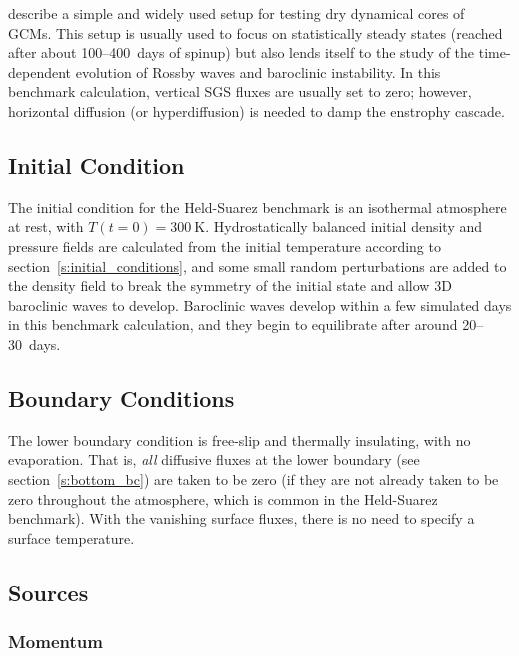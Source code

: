\documentclass{report}
\begin{document}
{\citet{Held94} describe a simple and widely used setup for testing dry dynamical cores of GCMs. This setup is usually used to focus on statistically steady states (reached after about 100--400~days of spinup) but also lends itself to the study of the time-dependent evolution of Rossby waves and baroclinic instability. In this benchmark calculation, vertical SGS fluxes are usually set to zero; however, horizontal diffusion (or hyperdiffusion) is needed to damp the enstrophy cascade. 

\subsection{Initial Condition}

The initial condition for the Held-Suarez benchmark is an isothermal atmosphere at rest, with $T(t=0) = 300~\mathrm{K}$. Hydrostatically balanced initial density and pressure fields are calculated from the initial temperature according to section~\ref{s:initial_conditions}, and some small random perturbations are added to the density field to break the symmetry of the initial state and allow 3D baroclinic waves to develop. Baroclinic waves develop within a few simulated days in this benchmark calculation, and they begin to equilibrate after around 20--30~days. 

\subsection{Boundary Conditions}

The lower boundary condition is free-slip and thermally insulating, with no evaporation. That is, \emph{all} diffusive fluxes at the lower boundary (see section~\ref{s:bottom_bc}) are taken to be zero (if they are not already taken to be zero throughout the atmosphere, which is common in the Held-Suarez benchmark). With the vanishing surface fluxes, there is no need to specify a surface temperature.

\subsection{Sources}

\subsubsection{Momentum} 

}
\end{document}
